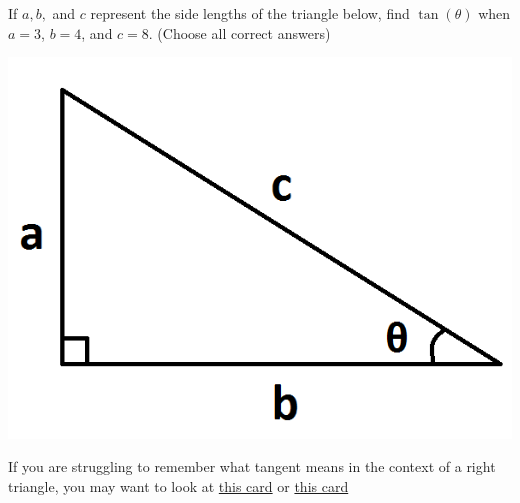 \documentclass{ximera}
\begin{document}
\begin{problem} 

\begin{problem}
    
    If $a, b,$ and $c$ represent the side lengths of the triangle below, find $\tan(\theta)$ when $a = 3$, $b = 4$, and $c = 8$.  (Choose all correct answers)
    
\begin{center} \includegraphics[scale=0.5]{Triangle.png} \end{center}

    \begin{hint}
    If you are struggling to remember what tangent means in the context of a right triangle, you may want to look at \href{https://ximera.osu.edu/math160fa17/m160prerequisites/prerequisiteVideos/trigUnitCircle}{this card} or \href{https://ximera.osu.edu/math160fa17/m160prerequisites/reviewOfFamousFunctions/digInTrigonometricFunctions}{this card}
    \end{hint}

  \begin{selectAll}
      
      
  \end{selectAll}
  

\end{problem}
\end{problem}
\end{document}
